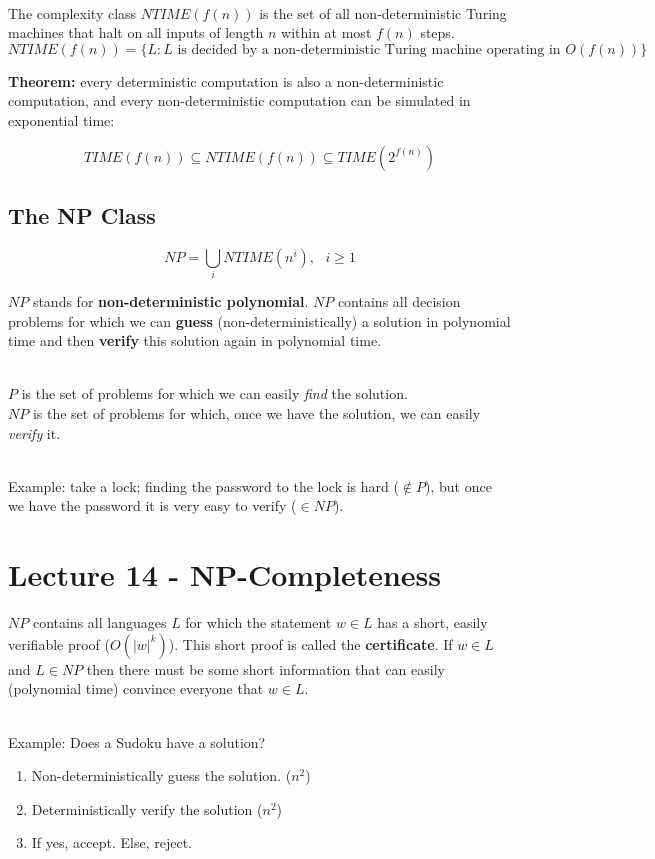 \documentclass[12pt]{article}
\begin{document}
\noindent
\\
The complexity class $NTIME(f(n))$ is the set of all non-deterministic Turing machines that halt on all inputs of length $n$ within at most $f(n)$ steps.
\[ NTIME(f(n)) = \{L : L \text{ is decided by a non-deterministic Turing machine operating in } O(f(n))\} \]

\noindent
\textbf{Theorem:} every deterministic computation is also a non-deterministic computation, and every non-deterministic computation can be simulated in exponential time:

\[ TIME(f(n)) \subseteq NTIME(f(n)) \subseteq TIME(2^{f(n)}) \]

\subsection*{The NP Class}

\[ NP = \bigcup_i NTIME(n^i), \text{  } i \geq 1 \]

\noindent
$NP$ stands for \textbf{non-deterministic polynomial}.
$NP$ contains all decision problems for which we can \textbf{guess} (non-deterministically) a solution in polynomial time and then \textbf{verify} this solution again in polynomial time.

\noindent
\\
$P$ is the set of problems for which we can easily \textit{find} the solution.\\
$NP$ is the set of problems for which, once we have the solution, we can easily \textit{verify} it.

\noindent
\\
Example: take a lock; finding the password to the lock is hard ($\notin P$), but once we have the password it is very easy to verify ($\in NP$).

%
%
\newpage
\section*{Lecture 14 - NP-Completeness}
$NP$ contains all languages $L$ for which the statement $w \in L$ has a short, easily verifiable proof ($O(|w|^k)$).
This short proof is called the \textbf{certificate}.
If $w \in L$ and $L \in NP$ then there must be some short information that can easily (polynomial time) convince everyone that $w \in L$.

\noindent
\\
Example: Does a Sudoku have a solution?

\begin{enumerate}
    \item Non-deterministically guess the solution. ($n^2$)
    \item Deterministically verify the solution ($n^2$)
    \item If yes, accept. Else, reject.
\end{enumerate}
\end{document}

